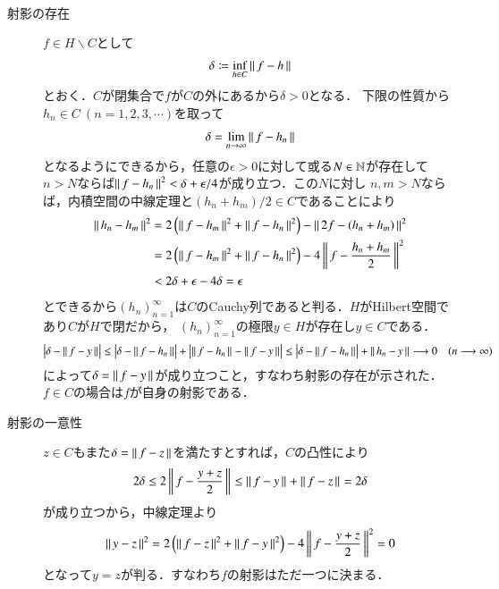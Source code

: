 \begin{qst}
\begin{prf}\mbox{}\\
	\begin{description}
	\item[射影の存在]
	$f \in H \backslash C$として
	\begin{align}
		\delta \coloneqq \operatorname*{inf}_{h \in C} \left\|\, f - h\, \right\|_{}
	\end{align}
	とおく．$C$が閉集合で$f$が$C$の外にあるから$\delta > 0$となる．
	下限の性質から$h_n \in C\ (n = 1,2,3,\cdots)$を取って
	\begin{align}
		\delta = \lim_{n \to \infty}\left\|\, f - h_n\, \right\|_{}
	\end{align}
	となるようにできるから，任意の$\epsilon > 0$に対して或る$N \in \mathbb{N}$が存在して
	$n> N$ならば$\left\|\, f - h_n\, \right\|_{}^2 < \delta + \epsilon/4$が成り立つ．この$N$に対し
	$n,m > N$ならば，内積空間の中線定理と$(h_n + h_m)/2 \in C$であることにより
	\begin{align}
		\left\|\, h_n - h_m\, \right\|_{}^2 &= 2\left( \left\|\, f - h_m\, \right\|_{}^2 + \left\|\, f - h_n\, \right\|_{}^2 \right) - \left\|\, 2f - (h_n + h_m)\, \right\|_{}^2 \\
		&= 2\left( \left\|\, f - h_m\, \right\|_{}^2 + \left\|\, f - h_n\, \right\|_{}^2 \right) - 4\left\|\, f - \frac{h_n + h_m}{2}\, \right\|_{}^2 \\
		&< 2\delta + \epsilon - 4\delta = \epsilon
	\end{align}
	とできるから$(h_n)_{n=1}^{\infty}$は$C$のCauchy列であると判る．$H$がHilbert空間であり$C$が$H$で閉だから，
	$(h_n)_{n=1}^{\infty}$の極限$y \in H$が存在し$y \in C$である．
	\begin{align}
		\left| \delta - \left\|\, f - y\, \right\|_{} \right| 
		\leq \left| \delta - \left\|\, f - h_n\, \right\|_{} \right| + \left| \left\|\, f - h_n\, \right\|_{} - \left\|\, f - y\, \right\|_{} \right|
		\leq \left| \delta - \left\|\, f - h_n\, \right\|_{} \right| + \left\|\, h_n - y\, \right\|_{}
		\longrightarrow 0 \quad (n \longrightarrow \infty)
	\end{align}
	によって$\delta = \left\|\, f - y\, \right\|_{}$が成り立つこと，すなわち射影の存在が示された．
	$f \in C$の場合は$f$が自身の射影である．

	\item[射影の一意性]
		$z \in C$もまた$\delta = \left\|\, f - z\, \right\|_{}$を満たすとすれば，$C$の凸性により
		\begin{align}
			2 \delta \leq 2\left\|\, f - \frac{y + z}{2}\, \right\|_{} \leq \left\|\, f - y\, \right\|_{} + \left\|\, f - z\, \right\|_{} = 2\delta
		\end{align}
		が成り立つから，中線定理より
		\begin{align}
			\left\|\, y - z\, \right\|_{}^2 = 2\left( \left\|\, f - z\, \right\|_{}^2 + \left\|\, f - y\, \right\|_{}^2 \right) - 4\left\|\, f - \frac{y + z}{2}\, \right\|_{}^2 = 0
		\end{align}
		となって$y = z$が判る．すなわち$f$の射影はただ一つに決まる．
	

\end{description}
\end{prf}
\end{qst}
